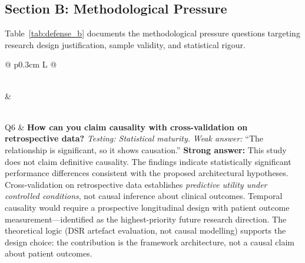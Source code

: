 \subsection{Section B: Methodological Pressure}

\noindent Table~\ref{tab:defense_b} documents the methodological pressure questions targeting research design justification, sample validity, and statistical rigour.

\tablefontsize
\begin{xltabular}
{\textwidth}{@{} p{0.3cm} L @{}}
\caption{Methodological Pressure Questions: Design, Validity, and Rigour} \label{tab:defense_b} \\
\toprule
\thead{\#} &  \\
\midrule
\endfirsthead
\endhead
\midrule
{} \\
\endfoot
\bottomrule
\endlastfoot

Q6 & \textbf{How can you claim causality with cross-validation on retrospective data?} \newline
\textit{Testing: Statistical maturity.} \newline\newline
\textit{Weak answer:} ``The relationship is significant, so it shows causation.'' \newline\newline
\textbf{Strong answer:} This study does not claim definitive causality. The findings indicate statistically significant performance differences consistent with the proposed architectural hypotheses. Cross-validation on retrospective data establishes \textit{predictive utility under controlled conditions}, not causal inference about clinical outcomes. Temporal causality would require a prospective longitudinal design with patient outcome measurement---identified as the highest-priority future research direction. The theoretical logic (DSR artefact evaluation, not causal modelling) supports the design choice: the contribution is the framework architecture, not a causal claim about patient outcomes. \\
\addlinespace


\end{xltabular}
